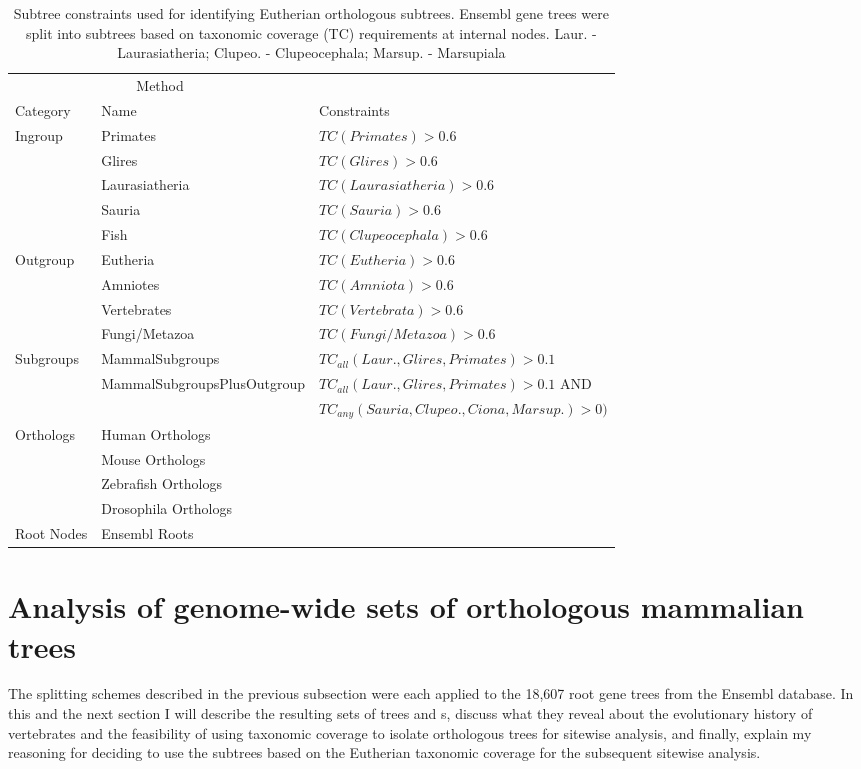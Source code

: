 \begin{table}[ht] \footnotesize
\centering
\begin{tabular}{@{}lll@{}} \toprule
\multicolumn{2}{c}{Method} \\ \cmidrule(r){1-2}
   Category & Name & Constraints \\ \midrule
Ingroup & Primates & $TC(Primates) > 0.6$ \\
 &   Glires &  $TC(Glires) > 0.6$ \\
 &   Laurasiatheria & $TC(Laurasiatheria) > 0.6$ \\
 &   Sauria & $TC(Sauria) > 0.6$ \\
 &   Fish & $TC(Clupeocephala) > 0.6$ \\
Outgroup &  Eutheria & $TC(Eutheria) > 0.6$ \\
 &   Amniotes & $TC(Amniota) > 0.6$\\
 &   Vertebrates & $TC(Vertebrata) > 0.6$\\
 &   Fungi/Metazoa & $TC(Fungi/Metazoa) > 0.6$\\
Subgroups &  MammalSubgroups & $TC_{all}(Laur., Glires, Primates) > 0.1$\\
 &   MammalSubgroupsPlusOutgroup & $TC_{all}(Laur., Glires, Primates) > 0.1$ AND \\
 &    & $TC_{any}(Sauria, Clupeo., Ciona, Marsup.) > 0)$ \\
Orthologs & Human Orthologs & \\
 &   Mouse Orthologs &  \\
 &   Zebrafish Orthologs &  \\
 &   Drosophila Orthologs &  \\
Root Nodes & Ensembl Roots &  \\
\bottomrule
\end{tabular}
\caption{Subtree constraints used for identifying Eutherian
  orthologous subtrees. Ensembl gene trees were split into subtrees
  based on taxonomic coverage (TC) requirements at internal
  nodes. Laur. - Laurasiatheria; Clupeo. - Clupeocephala; Marsup. -
  Marsupiala}
\label{subtree_constraints}
\end{table}

\section{Analysis of genome-wide sets of orthologous mammalian trees}

The \subtr splitting schemes described in the previous subsection were
each applied to the 18,607 root gene trees from the Ensembl
database. In this and the next section I will describe the resulting
sets of trees and \subtr{}s, discuss what they reveal about the
evolutionary history of vertebrates and the feasibility of using
taxonomic coverage to isolate orthologous trees for sitewise analysis,
and finally, explain my reasoning for deciding to use the subtrees
based on the Eutherian taxonomic coverage for the subsequent sitewise
analysis.

